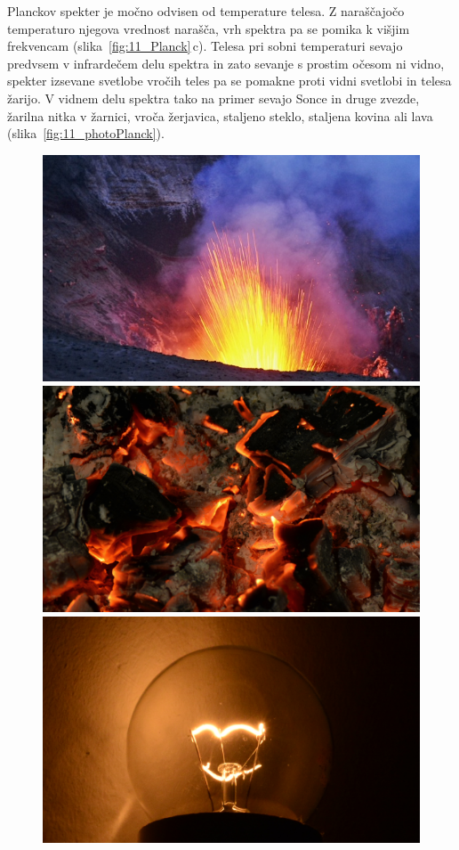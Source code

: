 \begin{remark}
Planckov spekter je močno odvisen od temperature telesa. Z naraščajočo
temperaturo njegova vrednost narašča, vrh spektra pa se pomika k višjim
frekvencam (slika~\ref{fig:11_Planck}\,c). Telesa pri sobni temperaturi
sevajo predvsem v infrardečem delu spektra in zato sevanje s prostim očesom
ni vidno, spekter izsevane svetlobe vročih teles pa se pomakne proti
vidni svetlobi in telesa žarijo. V vidnem delu spektra tako na primer sevajo Sonce in 
druge zvezde, žarilna nitka v žarnici, vroča žerjavica, staljeno steklo,
staljena kovina ali lava (slika~\ref{fig:11_photoPlanck}). 
\end{remark}
\begin{figure}[ht]
\centering
\includegraphics[width=7truecm]{slike/11_photo_vulkan.jpg}\hfill
\includegraphics[width=7truecm]{slike/11_photo_zerjavica.jpg} \\ 
\includegraphics[width=7truecm]{slike/11_photo_zarnica.jpg}\hfill

\end{figure}
